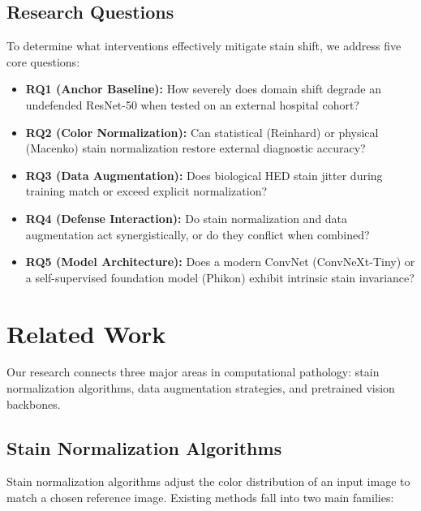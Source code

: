 \documentclass[11pt,a4paper]{article}
\begin{document}
\subsection{Research Questions}
To determine what interventions effectively mitigate stain shift, we address five core questions:
\begin{itemize}[leftmargin=*,itemsep=1pt]
  \item \textbf{RQ1 (Anchor Baseline):} How severely does domain shift degrade an undefended ResNet-50 when tested on an external hospital cohort?
  \item \textbf{RQ2 (Color Normalization):} Can statistical (Reinhard) or physical (Macenko) stain normalization restore external diagnostic accuracy?
  \item \textbf{RQ3 (Data Augmentation):} Does biological HED stain jitter during training match or exceed explicit normalization?
  \item \textbf{RQ4 (Defense Interaction):} Do stain normalization and data augmentation act synergistically, or do they conflict when combined?
  \item \textbf{RQ5 (Model Architecture):} Does a modern ConvNet (ConvNeXt-Tiny) or a self-supervised foundation model (Phikon) exhibit intrinsic stain invariance?
\end{itemize}


\section{Related Work}
Our research connects three major areas in computational pathology: stain
normalization algorithms, data augmentation strategies, and pretrained vision
backbones.

\subsection{Stain Normalization Algorithms}
Stain normalization algorithms adjust the color distribution of an input image to
match a chosen reference image. Existing methods fall into two main families:
\end{document}
